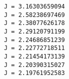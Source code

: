 \documentclass[11pt]{article}
\begin{document}
    \begin{Verbatim}[commandchars=\\\{\}]
J = 3.16303659094
J = 2.58238697469
J = 2.38077626178
J = 2.29120791199
J = 2.24686851239
J = 2.22772718511
J = 2.21454173139
J = 2.20390315027
J = 2.19761952583

    \end{Verbatim}

    \begin{center}
    \end{center}
    { \hspace*{\fill} \\}
    

    
    
    
    
\end{document}
